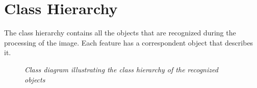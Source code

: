 	
	\section{Class Hierarchy}\label{classHierarchy}
	The class hierarchy contains all the objects that are recognized during the processing of the image. Each feature has a correspondent object that describes it. 
	
	\begin{figure}[h]
	  \begin{center} 
	  \end{center} 
	  \caption{\textit{Class diagram illustrating the class hierarchy of the recognized objects}}  
	  \label{fig:HierarchyDesign}
 	\end{figure}


